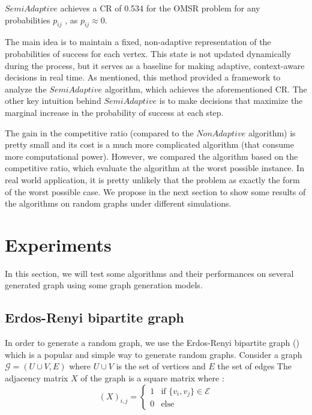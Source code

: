 \documentclass[12pt, twocolumn]{article}
\begin{document}
\begin{theorem}
    $SemiAdaptive$ achieves a CR of 0.534 for the OMSR problem for any probabilities $p_{ij}$ , as $p_{ij}\approx 0$.
\end{theorem}

\par
\hspace{\parindent}The main idea is to maintain a fixed, non-adaptive representation of the probabilities of success for each vertex. This state is not updated dynamically during the process, but it serves as a baseline for making adaptive, context-aware decisions in real time. As mentioned, this method provided a framework to analyze the $SemiAdaptive$ algorithm, which achieves the aforementioned CR. The other key intuition behind $SemiAdaptive$ is to make decisions that maximize the marginal increase in the probability of success at each step.

\par
\hspace{\parindent}The gain in the competitive ratio (compared to the $NonAdaptive$ algorithm) is pretty small and its cost is a much more complicated algorithm (that consume more computational power). However, we compared the algorithm based on the competitive ratio, which evaluate the algorithm at the worst possible instance. In real world application, it is pretty unlikely that the problem as exactly the form of the worst possible case. We propose in the next section to show some results of the algorithms on random graphs under different simulations.


\section{Experiments}

\par
\hspace{\parindent}In this section, we will test some algorithms and their performances on several generated graph using some graph generation models.

\subsection{Erdos-Renyi bipartite graph}

\par
\hspace{\parindent}In order to generate a random graph, we use the Erdos-Renyi bipartite graph (\cite{erdos1959}) which is a popular and simple way to generate random graphs. Consider a graph $\mathcal{G} = \left( U \cup V, E\right)$ where $U \cup V$ is the set of vertices and $E$ the set of edges The adjacency matrix $X$ of the graph is a square matrix where : 
\[
(X)_{i,j} = 
\begin{cases}
1 & \text{if   } \{v_i, v_j\} \in \mathcal{E} \\
0 & \text{else}
\end{cases}
\]
\end{document}
